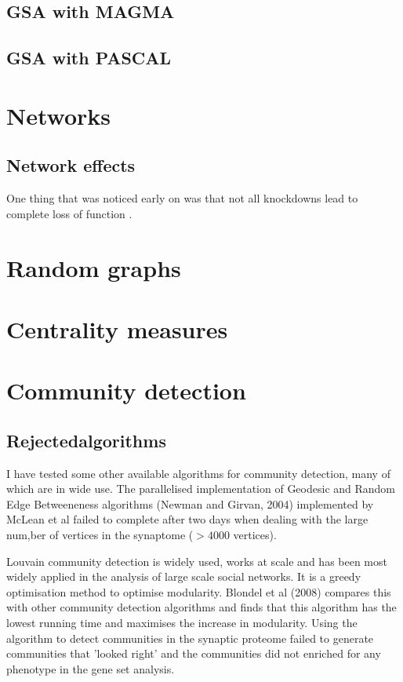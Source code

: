 \subsection{GSA with MAGMA}

\subsection{GSA with PASCAL}
\cite{lamparter2016fast}
\section{Networks}
\label{sec:networks_intro}
\subsection{Network effects}
One thing that was noticed early on was that not all knockdowns lead to complete loss of function \cite{keverne1997evaluation}. \cite{charlesworth2016canalization}
\section{Random graphs}
\label{sec: intro_random_graphs}
\section{Centrality measures}
\label{sec: intro_centrality_measures}
\section{Community detection}
\subsection{Rejectedalgorithms}

I have tested some other available algorithms for community detection, many of which are in wide use. The parallelised implementation of Geodesic and Random Edge Betweeneness algorithms (Newman and Girvan, 2004) implemented by McLean et al failed to complete after two days when dealing with the large num,ber of vertices in the synaptome ($>4000$ vertices).\cite{mclean2016improved}

Louvain \cite{blondel2008fast} community detection is widely used, works at scale and has been most widely applied in the analysis of large scale social networks. It is a greedy optimisation method to optimise modularity. 
Blondel et al (2008) compares this with other community detection algorithms and finds that this algorithm has the lowest running time and maximises the increase in modularity.
Using the algorithm to detect communities in the synaptic proteome failed to generate communities that 'looked right' and the communities did not enriched for any phenotype in the gene set analysis.

